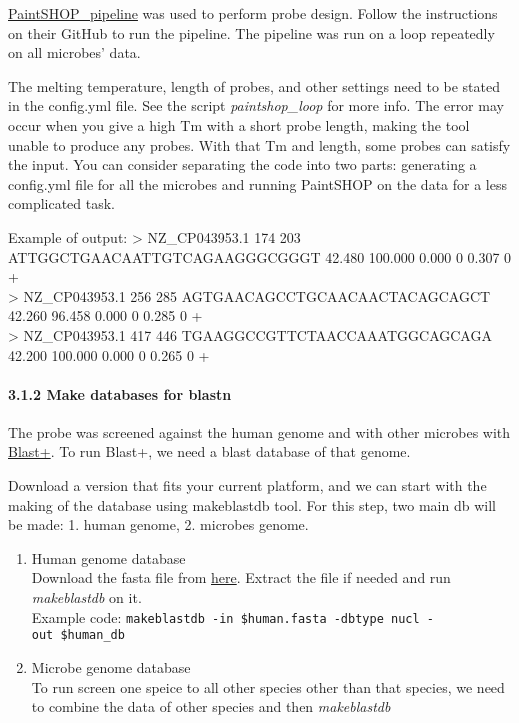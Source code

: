\documentclass[
]{article}
\begin{document}
\href{https://github.com/beliveau-lab/PaintSHOP_pipeline}{PaintSHOP\_pipeline}
was used to perform probe design. Follow the instructions on their
GitHub to run the pipeline. The pipeline was run on a loop repeatedly on
all microbes' data.

The melting temperature, length of probes, and other settings need to be
stated in the config.yml file. See the script \emph{paintshop\_loop} for
more info. The error may occur when you give a high Tm with a short
probe length, making the tool unable to produce any probes. With that Tm
and length, some probes can satisfy the input. You can consider
separating the code into two parts: generating a config.yml file for all
the microbes and running PaintSHOP on the data for a less complicated
task.

Example of output: \textgreater{} NZ\_CP043953.1 174 203
ATTGGCTGAACAATTGTCAGAAGGGCGGGT 42.480 100.000 0.000 0 0.307 0 +\\
\textgreater{} NZ\_CP043953.1 256 285 AGTGAACAGCCTGCAACAACTACAGCAGCT
42.260 96.458 0.000 0 0.285 0 +\\
\textgreater{} NZ\_CP043953.1 417 446 TGAAGGCCGTTCTAACCAAATGGCAGCAGA
42.200 100.000 0.000 0 0.265 0 +

\paragraph{3.1.2 Make databases for
blastn}\label{make-databases-for-blastn}

The probe was screened against the human genome and with other microbes
with
\href{https://blast.ncbi.nlm.nih.gov/doc/blast-help/downloadblastdata.html}{Blast+}.
To run Blast+, we need a blast database of that genome.

Download a version that fits your current platform, and we can start
with the making of the database using makeblastdb tool. For this step,
two main db will be made: 1. human genome, 2. microbes genome.

\begin{enumerate}
\def\labelenumi{\arabic{enumi}.}
\item
  Human genome database\\
  Download the fasta file from
  \href{https://www.ncbi.nlm.nih.gov/genome/guide/human/}{here}. Extract
  the file if needed and run \emph{makeblastdb} on it.\\
  Example code:
  \texttt{makeblastdb\ -in\ \$human.fasta\ -dbtype\ nucl\ -out\ \$human\_db}
\item
  Microbe genome database\\
  To run screen one speice to all other species other than that species,
  we need to combine the data of other species and then
  \emph{makeblastdb}
\end{enumerate}
\end{document}

